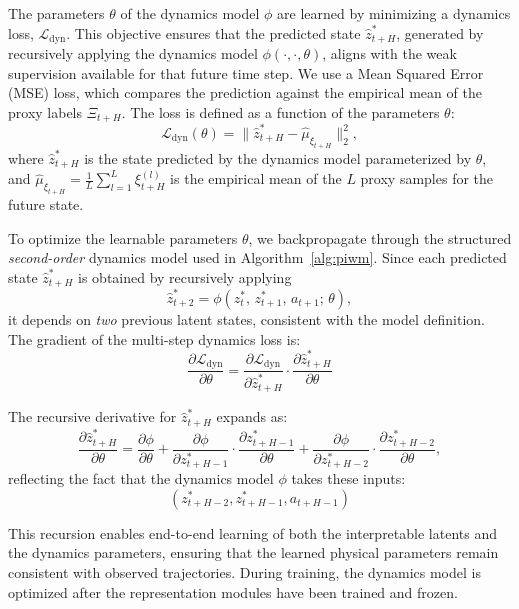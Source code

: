 \documentclass[nonacm,sigconf]{acmart}
\begin{document}
The parameters \(\theta\) of the dynamics model \(\phi\) are learned by minimizing a dynamics loss, \(\mathcal{L}_{\text{dyn}}\). This objective ensures that the predicted state \(\hat{z}^*_{t+H}\), generated by recursively applying the dynamics model \(\phi(\cdot, \cdot, \theta)\), aligns with the weak supervision available for that future time step. We use a Mean Squared Error (MSE) loss, which compares the prediction against the empirical mean of the proxy labels \(\Xi_{t+H}\). The loss is defined as a function of the parameters \(\theta\):
\begin{equation}
    \mathcal{L}_{\text{dyn}}(\theta) = \| \hat{z}^*_{t+H} -  \hat{\mu}_{\xi_{t+H}} \|_2^2,
\end{equation}
where $\hat{z}^*_{t+H}$ is the state predicted by the dynamics model parameterized by $\theta$, and $\hat{\mu}_{\xi_{t+H}} = \frac{1}{L}\sum_{l=1}^L \xi^{(l)}_{t+H}$ is the empirical mean of the $L$ proxy samples for the future state. 


To optimize the learnable parameters $\theta$, we backpropagate 
through the structured \emph{second-order} dynamics model used in Algorithm~\ref{alg:piwm}.
Since each predicted state $\hat{z}^{*}_{t+H}$ is obtained by recursively applying
\begin{equation}
\hat{z}^{*}_{t+2} = \phi(z^{*}_{t},\, z^{*}_{t+1},\, a_{t+1};\, \theta),
\end{equation}
it depends on \emph{two} previous latent states, consistent with the model definition.
The gradient of the multi-step dynamics loss is:
\begin{equation}
\frac{\partial \mathcal{L}_{\mathrm{dyn}}}{\partial \theta}
=
\frac{\partial \mathcal{L}_{\mathrm{dyn}}}{\partial \hat{z}^{*}_{t+H}}
\cdot
\frac{\partial \hat{z}^{*}_{t+H}}{\partial \theta}
\end{equation}

The recursive derivative for $\hat{z}^{*}_{t+H}$ expands as:
\begin{equation}
\frac{\partial \hat{z}^{*}_{t+H}}{\partial \theta}
=
\frac{\partial \phi}{\partial \theta}
+
\frac{\partial \phi}{\partial z^{*}_{t+H-1}}
\cdot
\frac{\partial z^{*}_{t+H-1}}{\partial \theta}
+
\frac{\partial \phi}{\partial z^{*}_{t+H-2}}
\cdot
\frac{\partial z^{*}_{t+H-2}}{\partial \theta},
\end{equation}
reflecting the fact that the dynamics model $\phi$ takes these inputs:
$$(z^{*}_{t+H-2}, z^{*}_{t+H-1}, a_{t+H-1})$$


This recursion enables end-to-end learning of both the interpretable 
latents and the dynamics parameters, ensuring that the learned physical 
parameters remain consistent with observed trajectories. During training, the dynamics model is optimized after the representation modules have been trained and frozen.
\end{document}
